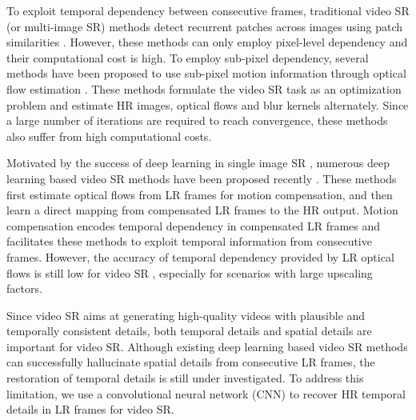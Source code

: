 \documentclass[journal]{IEEEtran}
\begin{document}
	To exploit temporal dependency between consecutive frames, traditional video SR (or multi-image SR) methods detect recurrent patches across images using patch similarities \cite{2009-GeneralizingtheNonlocalMeanstoSuperResolutionReconstruction-Protter-36-51,2009-SuperResolutionwithoutExplicitSubpixelMotionEstimation-Takeda-1958-1975}. However, these methods can only employ pixel-level dependency and their computational cost is high. To employ sub-pixel dependency, several methods have been proposed to use sub-pixel motion information through optical flow estimation   \cite{2007-OpticalFlowBasedSuperResolution:aProbabilisticApproach-Fransens-106-115,2014-OnBayesianAdaptiveVideoSuperResolution-Liu-346-360,2015-HandlingMotionBlurinMultiFrameSuperResolution-Ma-5224-5232}. These methods formulate the video SR task as an optimization problem and estimate HR images, optical flows and blur kernels alternately. Since a large number of iterations are required to reach convergence, these methods also suffer from high computational costs. 
	
	Motivated by the success of deep learning in single image SR \cite{2014-LearningaDeepConvolutionalNetworkforImageSuperResolution-Dong-184-199,2016-DeeplyRecursiveConvolutionalNetworkforImageSuperResolution-Kim-1637-1645,2017-DeepLaplacianPyramidNetworksforFastandAccurateSuperResolution-Lai-5835-5843}, numerous deep learning based video SR methods have been proposed recently \cite{2015-VideoSuperResolutionViaDeepDraftEnsembleLearning-Liao-531-539,2016-VideoSuperResolutionwithConvolutionalNeuralNetworks-Kappeler-109-122,2017-RealTimeVideoSuperResolutionwithSpatioTemporalNetworksandMotionCompensation-Caballero-2848-2857}. These methods first estimate optical flows from LR frames for motion compensation, and then learn a direct mapping from compensated LR frames to the HR output. Motion compensation encodes temporal dependency in compensated LR frames and facilitates these methods to exploit temporal information from consecutive frames. However, the accuracy of temporal dependency provided by LR optical flows is still low for video SR \cite{2013-SimultaneousSuperResolutionofDepthandImagesUsingaSingleCamera-Lee-281-288}, especially for scenarios with large upscaling factors. 
	
	Since video SR aims at generating high-quality videos with plausible and temporally consistent details, both temporal details and spatial details are important for video SR.  Although existing deep learning based video SR methods \cite{2015-VideoSuperResolutionViaDeepDraftEnsembleLearning-Liao-531-539,2016-VideoSuperResolutionwithConvolutionalNeuralNetworks-Kappeler-109-122,2017-RealTimeVideoSuperResolutionwithSpatioTemporalNetworksandMotionCompensation-Caballero-2848-2857} can successfully hallucinate spatial details from consecutive LR frames, the restoration of temporal details is still under investigated. To address this limitation, we use a convolutional neural network (CNN) to recover HR temporal details in LR frames for video SR. 
	
\end{document}
